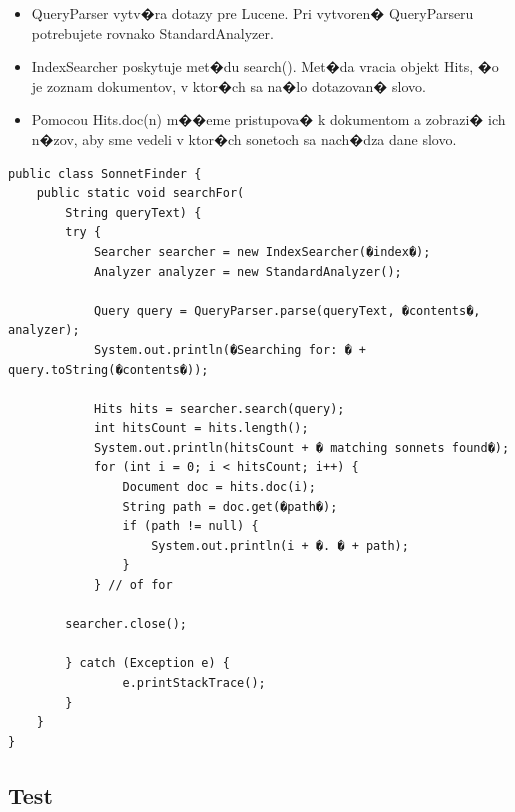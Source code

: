 \documentclass[11pt,a4paper]{article}
\begin{document}
\begin{itemize}
\item QueryParser vytv�ra dotazy pre Lucene. Pri vytvoren� QueryParseru potrebujete rovnako StandardAnalyzer.
\item IndexSearcher poskytuje met�du search(). Met�da vracia objekt Hits, �o je zoznam dokumentov, v ktor�ch sa na�lo dotazovan� slovo.
\item Pomocou Hits.doc(n) m��eme pristupova� k dokumentom a zobrazi� ich n�zov, aby sme vedeli v ktor�ch sonetoch sa nach�dza dane slovo.
\end{itemize}

\begin{verbatim}
public class SonnetFinder {
	public static void searchFor(
		String queryText) {
		try {
			Searcher searcher = new	IndexSearcher(�index�);
			Analyzer analyzer = new	StandardAnalyzer();

			Query query = QueryParser.parse(queryText, �contents�, analyzer);
			System.out.println(�Searching for: � + query.toString(�contents�));

			Hits hits = searcher.search(query);
			int hitsCount =	hits.length();
			System.out.println(hitsCount + � matching sonnets found�);
			for (int i = 0;	i < hitsCount; i++) {
				Document doc = hits.doc(i);
				String path = doc.get(�path�);
				if (path != null) {
					System.out.println(i + �. � + path);
				}
			} // of for

		searcher.close();

		} catch (Exception e) {
				e.printStackTrace();
		}
	}
}
\end{verbatim}

\newpage 

\subsection{Test}
\end{document}
